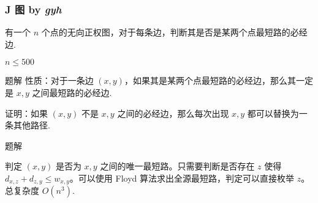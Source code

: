 \frame
{
  \frametitle{J 图 {by \itshape gyh}}

	有一个 $n$ 个点的无向正权图，对于每条边，判断其是否是某两个点最短路的必经边.

	$n\leq 500$

}

\begin{frame}{题解}
	性质：对于一条边 $(x,y)$，如果其是某两个点最短路的必经边，那么其一定是 $x,y$ 之间最短路的必经边.

	证明：如果 $(x,y)$ 不是 $x,y$ 之间的必经边，那么每次出现 $x,y$ 都可以替换为一条其他路径.

\end{frame}

\begin{frame}{题解}

	判定 $(x,y)$ 是否为 $x,y$ 之间的唯一最短路。只需要判断是否存在 $z$ 使得 $d_{x,z}+d_{z,y}\leq w_{x,y}$。可以使用 Floyd 算法求出全源最短路，判定可以直接枚举 $z$。总复杂度 $O(n^3)$.

\end{frame}
